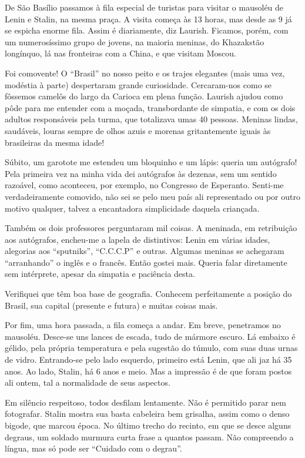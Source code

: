 De São Basílio passamos à fila especial de turistas para visitar o mausoléu de Lenin e Stalin, na mesma praça. A visita começa às 13 horas, mas desde as 9 já se espicha enorme fila. Assim é diariamente, diz Laurish. Ficamos, porém, com um numerosíssimo grupo de jovens, na maioria meninas, do Khazakstão longínquo, lá nas fronteiras com a China, e que visitam Moscou.

Foi comovente! O ``Brasil'' no nosso peito e os trajes elegantes (mais uma vez, modéstia à parte) despertaram grande curiosidade. Cercaram-nos como se fôssemos camelôs do largo da Carioca em plena função. Laurish ajudou como pôde para me entender com a moçada, transbordante de simpatia, e com os dois adultos responsáveis pela turma, que totalizava umas 40 pessoas. Meninas lindas, saudáveis, louras sempre de olhos azuis e morenas gritantemente iguais às brasileiras da mesma idade!

Súbito, um garotote me estendeu um bloquinho e um lápis: queria um autógrafo! Pela primeira vez na minha vida dei autógrafos às dezenas, sem um sentido razoável, como aconteceu, por exemplo, no Congresso de Esperanto. Senti-me verdadeiramente comovido, não sei se pelo meu país ali representado ou por outro motivo qualquer, talvez a encantadora simplicidade daquela criançada.

Também os dois professores perguntaram mil coisas. A meninada, em retribuição aos autógrafos, encheu-me a lapela de distintivos: Lenin em várias idades, alegorias aos ``sputniks'', ``C.C.C.P'' e outras. Algumas meninas se achegaram ``arranhando'' o inglês e o francês. Então gostei mais. Queria falar diretamente sem intérprete, apesar da simpatia e paciência desta.

Verifiquei que têm boa base de geografia. Conhecem perfeitamente a posição do Brasil, sua capital (presente e futura) e muitas coisas mais.

Por fim, uma hora passada, a fila começa a andar. Em breve, penetramos no mausoléu. Desce-se uns lances de escada, tudo de mármore escuro. Lá embaixo é gélido, pela própria temperatura e pela sugestão do túmulo, com suas duas urnas de vidro. Entrando-se pelo lado esquerdo, primeiro está Lenin, que ali jaz há 35 anos. Ao lado, Stalin, há 6 anos e meio. Mas a impressão é de que foram postos ali ontem, tal a normalidade de seus aspectos.

Em silêncio respeitoso, todos desfilam lentamente. Não é permitido parar nem fotografar. Stalin mostra sua basta cabeleira bem grisalha, assim como o denso bigode, que marcou época. No último trecho do recinto, em que se desce alguns degraus, um soldado murmura curta frase a quantos passam. Não compreendo a língua, mas só pode ser ``Cuidado com o degrau''.

